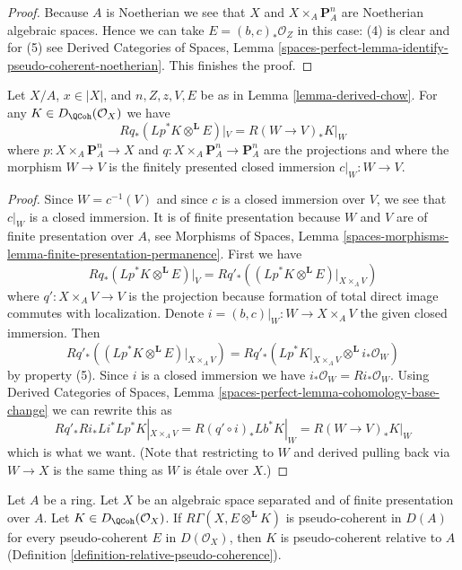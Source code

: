\begin{proof}
\medskip\noindent
Because $A$ is Noetherian we see that $X$ and $X \times_A \mathbf{P}^n_A$
are Noetherian algebraic spaces. Hence we can take $E = (b, c)_*\mathcal{O}_Z$
in this case: (4) is clear and for (5) see
Derived Categories of Spaces, Lemma
\ref{spaces-perfect-lemma-identify-pseudo-coherent-noetherian}.
This finishes the proof.
\end{proof}

\begin{lemma}
\label{lemma-compute-Fourier-Mukai-for-derived-chow}
Let $X/A$, $x \in |X|$, and
$n, Z, z, V, E$ be as in Lemma \ref{lemma-derived-chow}.
For any $K \in D_\QCoh(\mathcal{O}_X)$ we have
$$
Rq_*(Lp^*K \otimes^\mathbf{L} E)|_V = R(W \to V)_*K|_W
$$
where $p : X \times_A \mathbf{P}^n_A \to X$ and
$q : X \times_A \mathbf{P}^n_A \to \mathbf{P}^n_A$ are
the projections and where the morphism $W \to V$ is
the finitely presented closed immersion $c|_W : W \to V$.
\end{lemma}

\begin{proof}
Since $W = c^{-1}(V)$ and since $c$ is a closed immersion
over $V$, we see that $c|_W$ is a closed immersion.
It is of finite presentation because $W$ and $V$ are of finite
presentation over $A$, see
Morphisms of Spaces, Lemma
\ref{spaces-morphisms-lemma-finite-presentation-permanence}.
First we have
$$
Rq_*(Lp^*K \otimes^\mathbf{L} E)|_V =
Rq'_*\left((Lp^*K \otimes^\mathbf{L} E)|_{X \times_A V}\right)
$$
where $q' : X \times_A V \to V$ is the projection because
formation of total direct image commutes with localization.
Denote $i = (b, c)|_W : W \to X \times_A V$ the given closed immersion.
Then
$$
Rq'_*\left((Lp^*K \otimes^\mathbf{L} E)|_{X \times_A V}\right) =
Rq'_*(Lp^*K|_{X \times_A V} \otimes^\mathbf{L} i_*\mathcal{O}_W)
$$
by property (5). Since $i$ is a closed immersion we have
$i_*\mathcal{O}_W = Ri_*\mathcal{O}_W$.
Using
Derived Categories of Spaces,
Lemma \ref{spaces-perfect-lemma-cohomology-base-change}
we can rewrite this as
$$
Rq'_* Ri_* Li^* Lp^*K|_{X \times_A V} =
R(q' \circ i)_* Lb^*K|_W =
R(W \to V)_* K|_W
$$
which is what we want. (Note that restricting to $W$
and derived pulling back via $W \to X$ is the same thing
as $W$ is \'etale over $X$.)
\end{proof}

\begin{lemma}
\label{lemma-characterize-pseudo-coherent}
Let $A$ be a ring. Let $X$ be an algebraic space separated and
of finite presentation over $A$. Let $K \in D_\QCoh(\mathcal{O}_X)$.
If $R\Gamma(X, E \otimes^\mathbf{L} K)$ is pseudo-coherent
in $D(A)$ for every pseudo-coherent $E$ in $D(\mathcal{O}_X)$,
then $K$ is pseudo-coherent relative to $A$
(Definition \ref{definition-relative-pseudo-coherence}).
\end{lemma}

